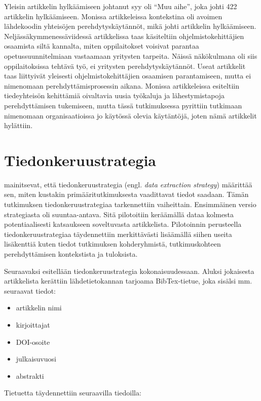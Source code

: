 \documentclass[utf8]{gradu3}
\begin{document}
Yleisin artikkelin hylkäämiseen johtanut syy oli ``Muu aihe'', joka johti 422 artikkelin hylkäämiseen. Monissa artikkeleissa kontekstina oli avoimen lähdekoodin yhteisöjen perehdytyskäytännöt, mikä johti artikkelin hylkäämiseen. Neljässäkymmenessäviidessä artikkelissa taas käsiteltiin ohjelmistokehittäjien osaamista siltä kannalta, miten oppilaitokset voisivat parantaa opetussuunnitelmiaan vastaamaan yritysten tarpeita. Näissä näkökulmana oli siis oppilaitoksissa tehtävä työ, ei yritysten perehdytyskäytännöt. Useat artikkelit taas liittyivät yleisesti ohjelmistokehittäjien osaamisen parantamiseen, mutta ei nimenomaan perehdyttämisprosessin aikana. Monissa artikkeleissa esiteltiin tiedeyhteisön kehittämiä oivaltavia uusia työkaluja ja lähestymistapoja perehdyttämisen tukemiseen, mutta tässä tutkimuksessa pyrittiin tutkimaan nimenomaan organisaatioissa jo käytössä olevia käytäntöjä, joten nämä artikkelit hylättiin.

\section{Tiedonkeruustrategia}
\label{luku-tiedonkeruustrategia}

\textcite{kitchenham-charters-2007} mainitsevat, että tiedonkeruustrategia (engl. \textit{data extraction strategy}) määrittää sen, miten kustakin primääritutkimuksesta vaadittavat tiedot saadaan. Tämän tutkimuksen tiedonkeruustrategiaa tarkennettiin vaiheittain. Ensimmäinen versio strategiasta oli suuntaa-antava. Sitä pilotoitiin keräämällä dataa kolmesta potentiaalisesti katsaukseen soveltuvasta artikkelista. Pilotoinnin perusteella tiedonkeruustrategiaa täydennettiin merkittävästi lisäämällä siihen useita lisäkenttiä kuten tiedot tutkimuksen kohderyhmistä, tutkimuskohteen perehdyttämisen kontekstista ja tuloksista.

Seuraavaksi esitellään tiedonkeruustrategia kokonaisuudessaan. Aluksi jokaisesta artikkelista kerättiin lähdetietokannan tarjoama BibTex-tietue, joka sisälsi mm. seuraavat tiedot:

\begin{itemize}
    \item artikkelin nimi
    \item kirjoittajat
    \item DOI-osoite
    \item julkaisuvuosi
    \item abstrakti
\end{itemize}

Tietuetta täydennettiin seuraavilla tiedoilla:
\end{document}
